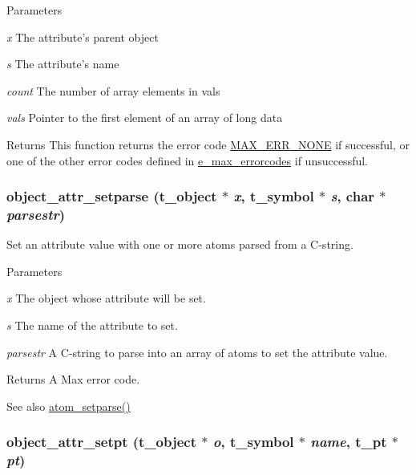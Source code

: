 \begin{DoxyParams}{Parameters}
\item[{\em x}]The attribute's parent object \item[{\em s}]The attribute's name \item[{\em count}]The number of array elements in vals \item[{\em vals}]Pointer to the first element of an array of long data\end{DoxyParams}
\begin{DoxyReturn}{Returns}
This function returns the error code \hyperlink{group__misc_gga0764dd6c02b76cca7d053ae50555d69da6d22f77fef8b1e1b074cef5d29d935fd}{MAX\_\-ERR\_\-NONE} if successful, or one of the other error codes defined in \hyperlink{group__misc_ga0764dd6c02b76cca7d053ae50555d69d}{e\_\-max\_\-errorcodes} if unsuccessful. 
\end{DoxyReturn}
\hypertarget{group__attr_gaf79751759f1e9d544453668c4cb4bee2}{
\subsubsection[{object\_\-attr\_\-setparse}]{ object\_\-attr\_\-setparse ({\bf t\_\-object} $\ast$ {\em x}, \/  {\bf t\_\-symbol} $\ast$ {\em s}, \/  char $\ast$ {\em parsestr})}}
\label{group__attr_gaf79751759f1e9d544453668c4cb4bee2}


Set an attribute value with one or more atoms parsed from a C-\/string. 
\begin{DoxyParams}{Parameters}
\item[{\em x}]The object whose attribute will be set. \item[{\em s}]The name of the attribute to set. \item[{\em parsestr}]A C-\/string to parse into an array of atoms to set the attribute value. \end{DoxyParams}
\begin{DoxyReturn}{Returns}
A Max error code. 
\end{DoxyReturn}
\begin{DoxySeeAlso}{See also}
\hyperlink{group__atom_ga55938aedb41a8f3565680cf29169dc70}{atom\_\-setparse()} 
\end{DoxySeeAlso}
\hypertarget{group__attr_gab463fe66773f6d20586efdb69fa8ddd4}{
\subsubsection[{object\_\-attr\_\-setpt}]{ object\_\-attr\_\-setpt ({\bf t\_\-object} $\ast$ {\em o}, \/  {\bf t\_\-symbol} $\ast$ {\em name}, \/  {\bf t\_\-pt} $\ast$ {\em pt})}}
\label{group__attr_gab463fe66773f6d20586efdb69fa8ddd4}



